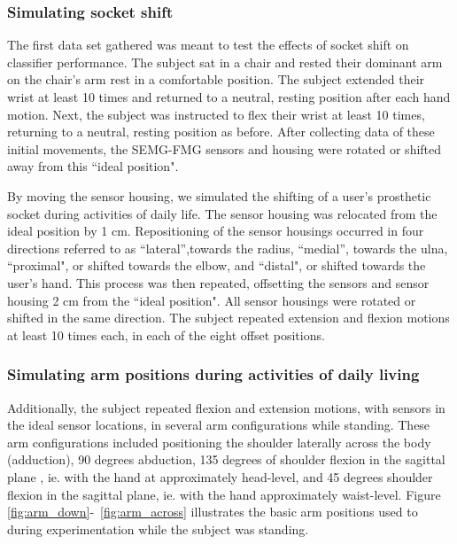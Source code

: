 \documentclass[twocolumn]{sagej}
\begin{document}
\subsubsection*{Simulating socket shift}
\label{sec:exp_prot-shift}

The first data set gathered was meant to test the effects of socket shift on classifier performance. The subject sat in a chair and rested their dominant arm on the chair's arm rest in a comfortable position.  The subject extended their wrist at least 10 times and returned to a neutral, resting position after each hand motion.  Next, the subject was instructed to flex their wrist at least 10 times, returning to a neutral, resting position as before.  After collecting data of these initial movements, the SEMG-FMG sensors and housing were rotated or shifted away from this ``ideal position".\par \noindent%
By moving the sensor housing, we simulated the shifting of a user's prosthetic socket during activities of daily life.  The sensor housing was relocated from the ideal position by 1 cm.  Repositioning of the sensor housings occurred in four directions referred to as ``lateral'',towards the radius, ``medial'', towards the ulna, ``proximal", or shifted towards the elbow, and ``distal", or shifted towards the user's hand.  This process was then repeated, offsetting the sensors and sensor housing 2 cm from the ``ideal position".  All sensor housings were rotated or shifted in the same direction.  The subject repeated extension and flexion motions at least 10 times each, in each of the eight offset positions. \par \noindent

\subsubsection*{Simulating arm positions during activities of daily living}
\label{sec:exp_prot-ADL}

Additionally, the subject repeated flexion and extension motions, with sensors in the ideal sensor locations, in several arm configurations while standing.  These arm configurations included positioning the shoulder laterally across the body (adduction), 90 degrees abduction, 135 degrees of shoulder flexion in the sagittal plane , ie. with the hand at approximately head-level, and 45 degrees shoulder flexion in the sagittal plane, ie. with the hand approximately waist-level.  Figure \ref{fig:arm_down}-~\ref{fig:arm_across} illustrates the basic arm positions used to during experimentation while the subject was standing.  \par \noindent
\end{document}
